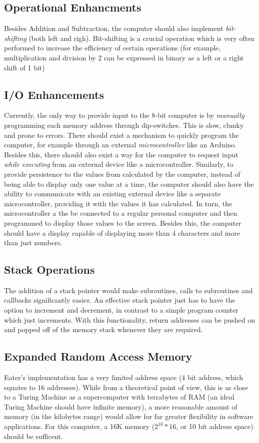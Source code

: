 \subsection{Operational Enhancments}
Besides Addition and Subtraction, the computer should also implement \emph{bit-shifting} (both left and righ). Bit-shifting is a crucial operation which is very often performed to increase the efficiency of certain operations (for example, multiplication and division by 2 can be expressed in binary as a left or a right shift of 1 bit)

\subsection{I/O Enhancements}
Currently, the only way to provide input to the 8-bit computer is by \emph{manually} programming each memory address through dip-switches. This is slow, clunky and prone to errors. There should exist a mechanism to quickly program the computer, for example through an external \emph{microcontroller} like an Arduino. Besides this, there should also exist a way for the computer to request input \emph{while executing} from an external device like a microcontroller.
Similarly, to provide persistence to the values from calculated by the computer, instead of being able to display only one value at a time, the computer should also have the ability to communicate with an existing external device like a separate microcontroller, providing it with the values it has calculated. In turn, the microcontroller a the be connected to a regular personal computer and then programmed to display those values to the screen. Besides this, the computer should have a display capable of displaying
more than 4 characters and more than just numbers.

\subsection{Stack Operations}
The addition of a stack pointer would make subroutines, calls to subroutines and callbacks significantly easier. An effective
stack pointer just has to have the option to increment and decrement, in contrast to a simple program counter which just increments.
With this functionality, return addresses can be pushed on and popped off of the memory stack whenever they are required.

\subsection{Expanded Random Access Memory}
Eater's implementation has a very limited address space (4 bit address, which equates to 16 addresses). While from a theoretical
point of view, this is as close to a Turing Machine as a supercomputer with terrabytes of RAM (an ideal Turing Machine should have infinite memory), a more reasonable amount of memory (in the kilobytes range) would allow for far greater flexibility in software
applications. For this computer, a 16K memory (\(2^10 * 16\), or 10 bit address space) should be sufficent.

